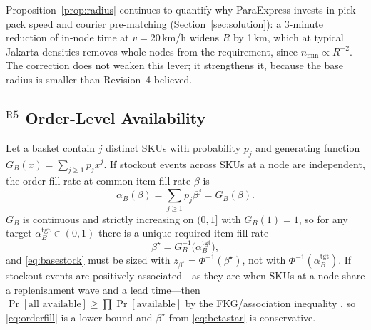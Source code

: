 \begin{remark}
Proposition~\ref{prop:radius} continues to quantify why ParaExpress invests in pick--pack speed and courier pre-matching (Section~\ref{sec:solution}): a 3-minute reduction of in-node time at $v=20$\,km/h widens $R$ by 1\,km, which at typical Jakarta densities removes whole nodes from the requirement, since $n_{\min}\propto R^{-2}$. The correction does not weaken this lever; it strengthens it, because the base radius is smaller than Revision~4 believed.
\end{remark}

\subsection{$^{\mathrm{R5}}$ Order-Level Availability}

\begin{proposition}\label{prop:orderfill}
Let a basket contain $j$ distinct SKUs with probability $p_j$ and generating function $G_B(x)=\sum_{j\ge1}p_jx^{j}$. If stockout events across SKUs at a node are independent, the order fill rate at common item fill rate $\beta$ is
\begin{equation}\label{eq:orderfill}
\alpha_B(\beta)=\sum_{j\ge1}p_j\beta^{j}=G_B(\beta).
\end{equation}
$G_B$ is continuous and strictly increasing on $(0,1]$ with $G_B(1)=1$, so for any target $\alpha_B^{\mathrm{tgt}}\in(0,1)$ there is a unique required item fill rate
\begin{equation}\label{eq:betastar}
\beta^\star=G_B^{-1}\bigl(\alpha_B^{\mathrm{tgt}}\bigr),
\end{equation}
and \eqref{eq:basestock} must be sized with $z_{\beta^\star}=\Phi^{-1}(\beta^\star)$, not with $\Phi^{-1}(\alpha_B^{\mathrm{tgt}})$. If stockout events are positively associated---as they are when SKUs at a node share a replenishment wave and a lead time---then $\Pr[\text{all available}]\ge\prod\Pr[\text{available}]$ by the FKG/association inequality \cite{esary1967}, so \eqref{eq:orderfill} is a lower bound and $\beta^\star$ from \eqref{eq:betastar} is conservative.
\end{proposition}


